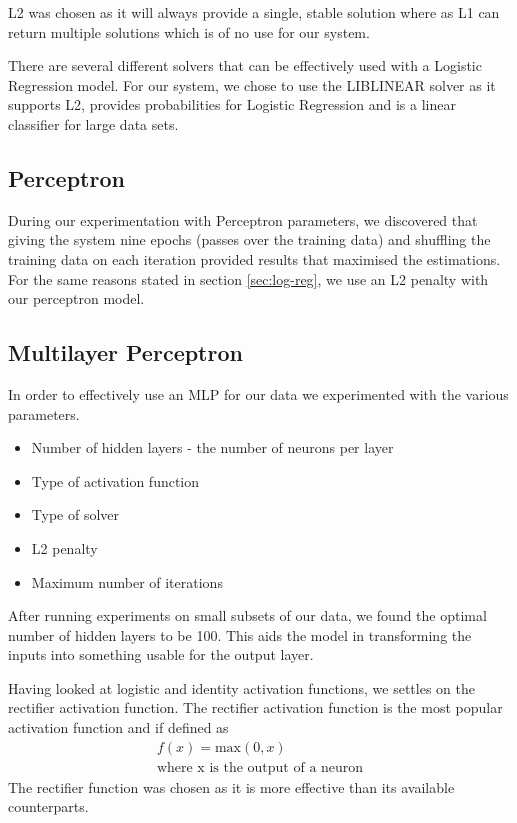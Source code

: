 \documentclass[bsc,frontabs,twoside,singlespacing,parskip,deptreport]{infthesis}     %
\begin{document}
 L2 was chosen as it will always provide a single, stable solution where as L1 can return multiple solutions
 which is of no use for our system.

 There are several different solvers that can be effectively used with a Logistic Regression model.
 For our system, we chose to use the LIBLINEAR solver as it supports L2, provides probabilities
 for Logistic Regression and is a linear classifier for large data sets\cite{fan2008liblinear}.
 
 \subsection{Perceptron}
 During our experimentation with Perceptron parameters, we discovered that giving the system nine epochs (passes
 over the training data) and shuffling the training data on each iteration provided results that maximised the
 estimations. For the same reasons stated in section \ref{sec:log-reg}, we use an L2 penalty with our perceptron
 model.
 
 \subsection{Multilayer Perceptron}
 In order to effectively use an MLP for our data we experimented with the various parameters.
 \begin{itemize}
 \item Number of hidden layers - the number of neurons per layer
 \item Type of activation function
 \item Type of solver
 \item L2 penalty
 \item Maximum number of iterations
 \end{itemize}
 
 After running experiments on  small subsets of our data, we found the optimal number of hidden layers to be 100. 
 This aids the model in transforming the inputs into something usable for the output layer.
 
 Having looked at logistic and identity activation functions, we settles on the rectifier activation function.
 The rectifier activation function is the most popular activation function \cite{lecun2015deep} and if defined as
 \begin{eqnarray}
   f(x) = \text{max}(0,x)\nonumber\\
   \text{where x is the output of a neuron}\nonumber
 \end{eqnarray}
 The rectifier function was chosen as it is more effective than its available counterparts\cite{glorot2011deep}.
\end{document}
